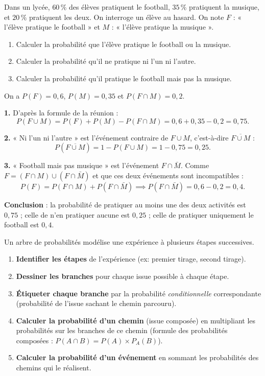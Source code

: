 \documentclass[11pt]{article}
\begin{document}
\begin{exoresolu}
Dans un lycée, $60\,\%$ des élèves pratiquent le football, $35\,\%$ pratiquent la musique, et $20\,\%$ pratiquent les deux. On interroge un élève au hasard. On note $F$ : « l'élève pratique le football » et $M$ : « l'élève pratique la musique ».
\begin{enumerate}
\item Calculer la probabilité que l'élève pratique le football ou la musique.
\item Calculer la probabilité qu'il ne pratique ni l'un ni l'autre.
\item Calculer la probabilité qu'il pratique le football mais pas la musique.
\end{enumerate}
\tcblower
On a $P(F) = 0{,}6$, $P(M) = 0{,}35$ et $P(F \cap M) = 0{,}2$.

\textbf{1.} D'après la formule de la réunion :
\[ P(F \cup M) = P(F) + P(M) - P(F \cap M) = 0{,}6 + 0{,}35 - 0{,}2 = 0{,}75. \]

\textbf{2.} « Ni l'un ni l'autre » est l'événement contraire de $F \cup M$, c'est-à-dire $\overline{F \cup M}$ :
\[ P(\overline{F \cup M}) = 1 - P(F \cup M) = 1 - 0{,}75 = 0{,}25. \]

\textbf{3.} « Football mais pas musique » est l'événement $F \cap \bar{M}$. Comme $F = (F \cap M) \cup (F \cap \bar{M})$ et que ces deux événements sont incompatibles :
\[ P(F) = P(F \cap M) + P(F \cap \bar{M}) \implies P(F \cap \bar{M}) = 0{,}6 - 0{,}2 = 0{,}4. \]

\textbf{Conclusion} : la probabilité de pratiquer au moins une des deux activités est $0{,}75$ ; celle de n'en pratiquer aucune est $0{,}25$ ; celle de pratiquer uniquement le football est $0{,}4$.
\end{exoresolu}

\begin{methode}
Un arbre de probabilités modélise une expérience à plusieurs étapes successives.
\begin{enumerate}
\item \textbf{Identifier les étapes} de l'expérience (ex: premier tirage, second tirage).
\item \textbf{Dessiner les branches} pour chaque issue possible à chaque étape.
\item \textbf{Étiqueter chaque branche} par la probabilité \emph{conditionnelle} correspondante (probabilité de l'issue sachant le chemin parcouru).
\item \textbf{Calculer la probabilité d'un chemin} (issue composée) en multipliant les probabilités sur les branches de ce chemin (formule des probabilités composées : $P(A \cap B) = P(A) \times P_A(B)$).
\item \textbf{Calculer la probabilité d'un événement} en sommant les probabilités des chemins qui le réalisent.
\end{enumerate}
\end{methode}
\end{document}
